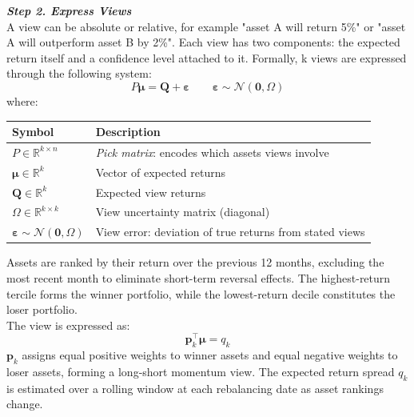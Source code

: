 \documentclass[a4paper,alpha-refs]{scr-contemporary}
\numberwithin{equation}{section}
\begin{document}
\noindent \textbf{\emph{Step 2. Express Views}} \\
\indent A view can be absolute or relative, for example "asset A will return 5\%" or 
"asset A will outperform asset B by 2\%".
Each view has two components: the expected return itself and a confidence 
level attached to it. \newline
\indent Formally, k views are expressed through the following system:
\begin{equation}
  P \boldsymbol{\mu} = \boldsymbol{Q} + \boldsymbol{\varepsilon}
  \qquad \boldsymbol{\varepsilon} \sim \mathcal{N}(\mathbf{0}, \Omega)
\end{equation}
where:
\begin{center}
\begin{tabular}{l l}
\toprule
\textbf{Symbol} & \textbf{Description} \\
\midrule
$P \in \mathbb{R}^{k \times n}$ & \emph{Pick matrix}: encodes which assets views involve \\
$\boldsymbol{\mu} \in \mathbb{R}^k$ & Vector of expected returns \\
$\boldsymbol{Q} \in \mathbb{R}^k$ & Expected view returns \\
$\Omega \in \mathbb{R}^{k \times k}$ & View uncertainty matrix (diagonal) \\
$\boldsymbol{\varepsilon} \sim \mathcal{N}(\mathbf{0}, \Omega)$ & View error: deviation of true returns from stated views \\
\bottomrule
\end{tabular}
\end{center}

\indent Assets are ranked by their return over the previous 12 months, excluding the most 
recent month to eliminate short-term reversal effects. The highest-return tercile forms
the winner portfolio, while the lowest-return decile constitutes the loser portfolio. \\
\indent The view is expressed as:
\begin{equation}
    \boldsymbol{p}_{k}^{\top} \boldsymbol{\mu} = q_k
\end{equation}
\indent $\boldsymbol{p}_k$ assigns equal positive weights to winner assets and equal negative weights 
to loser assets, forming a long-short momentum view. The expected return 
spread $q_k$ is estimated over a rolling window at each rebalancing date as asset rankings change. \\
\end{document}
